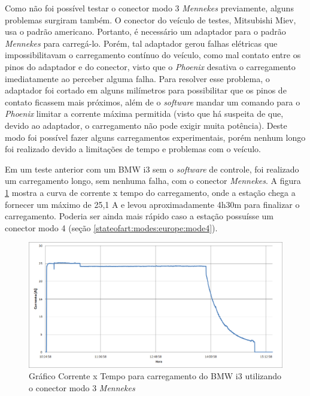     Como não foi possível testar o conector modo 3 \textit{Mennekes} previamente, alguns problemas surgiram também. O conector do veículo de testes, Mitsubishi Miev, usa o padrão americano. Portanto, é necessário um adaptador para o padrão \textit{Mennekes} para carregá-lo. Porém, tal adaptador gerou falhas elétricas que impossibilitavam o carregamento contínuo do veículo, como mal contato entre os pinos do adaptador e do conector, visto que o \textit{Phoenix} desativa o carregamento imediatamente ao perceber alguma falha. Para resolver esse problema, o adaptador foi cortado em alguns milímetros para possibilitar que os pinos de contato ficassem mais próximos, além de o \textit{software} mandar um comando para o \textit{Phoenix} limitar a corrente máxima permitida (visto que há suspeita de que, devido ao adaptador, o carregamento não pode exigir muita potência). Deste modo foi possível fazer alguns carregamentos experimentais, porém nenhum longo foi realizado devido a limitações de tempo e problemas com o veículo.

    Em um teste anterior com um BMW i3 sem o \textit{software} de controle, foi realizado um carregamento longo, sem nenhuma falha, com o conector \textit{Mennekes}. A figura \ref{fig:evse-charge} mostra a curva de corrente x tempo do carregamento, onde a estação chega a fornecer um máximo de 25,1 A e levou aproximadamente 4h30m para finalizar o carregamento. Poderia ser ainda mais rápido caso a estação possuísse um conector modo 4 (seção \ref{stateofart:modes:europe:mode4}).

    \begin{figure}[H]
      \begin{center}
        \includegraphics[width=\textwidth,natwidth=1420,natheight=2130]{assets/images/evse-charge.png}
        \caption{Gráfico Corrente x Tempo para carregamento do BMW i3 utilizando o conector modo 3 \textit{Mennekes}}
        \label{fig:evse-charge}
      \end{center}
    \end{figure}

